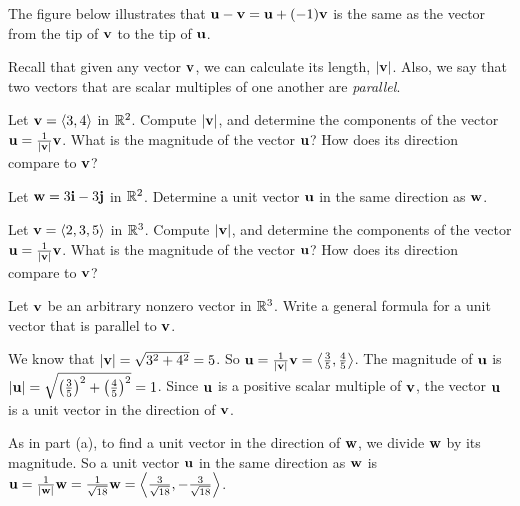 \begin{exercises}
\begin{exerciseSolution}
   
    \item The figure below illustrates that $\mathbf{u} - \mathbf{v} = \mathbf{u} + (-1)\mathbf{v}$ is the same as the vector from the tip of $\mathbf{v}$ to the tip of $\mathbf{u}$.
\begin{center}
\resizebox{!}{2.0in}{\texttt{[image: 9\_2\_Ex\_2\_d]}}
\end{center}   
   
    \ea
\end{exerciseSolution}


\item \label{Ez:9.2.3}  Recall that given any vector $\mathbf{v}$, we can calculate its length, $|\mathbf{v}|$.  Also, we say that two vectors that are scalar multiples of one another are \emph{parallel}. 


    \ba
    \item Let $\mathbf{v} = \langle 3,4 \rangle$ in $\mathbb{R}^2$.  Compute $|\mathbf{v}|$, and determine the components of the vector $\mathbf{u} = \frac{1}{|\mathbf{v}|} \mathbf{v}$.  What is the magnitude of the vector $\mathbf{u}$?  How does its direction compare to $\mathbf{v}$?
    
    \item Let $\mathbf{w} = 3\mathbf{i} - 3\mathbf{j}$ in $\mathbb{R}^2$.  Determine a unit vector $\mathbf{u}$ in the same direction as $\mathbf{w}$.
    
    \item Let $\mathbf{v} = \langle 2, 3, 5 \rangle$ in $\mathbb{R}^3$.  Compute $|\mathbf{v}|$, and determine the components of the vector $\mathbf{u} = \frac{1}{|\mathbf{v}|} \mathbf{v}$.  What is the magnitude of the vector $\mathbf{u}$?  How does its direction compare to $\mathbf{v}$?

    \item Let $\mathbf{v}$ be an arbitrary nonzero vector in $\mathbb{R}^3$. Write a general formula for a unit vector that is parallel to $\mathbf{v}$.

    \ea

\begin{exerciseSolution}
    \ba
     \item We know that $|\mathbf{v}| = \sqrt{3^2+4^2} = 5$. So $\mathbf{u} = \frac{1}{|\mathbf{v}|} \mathbf{v} = \left\langle \frac{3}{5}, \frac{4}{5} \right\rangle$. The magnitude of $\mathbf{u}$ is $|\mathbf{u}| = \sqrt{\left(\frac{3}{5}\right)^2 + \left(\frac{4}{5}\right)^2} = 1$. Since $\mathbf{u}$ is a positive scalar multiple of $\mathbf{v}$, the vector $\mathbf{u}$ is a unit vector in the direction of $\mathbf{v}$. 
    
    \item As in part (a), to find a unit vector in the direction of $\mathbf{w}$, we divide $\mathbf{w}$ by its magnitude. So a unit vector $\mathbf{u}$ in the same direction as $\mathbf{w}$ is $\mathbf{u} = \frac{1}{|\mathbf{w}|} \mathbf{w} = \frac{1}{\sqrt{18}} \mathbf{w} = \left\langle \frac{3}{\sqrt{18}}, -\frac{3}{\sqrt{18}} \right\rangle$.
    

\end{exerciseSolution}
\end{exercises}
